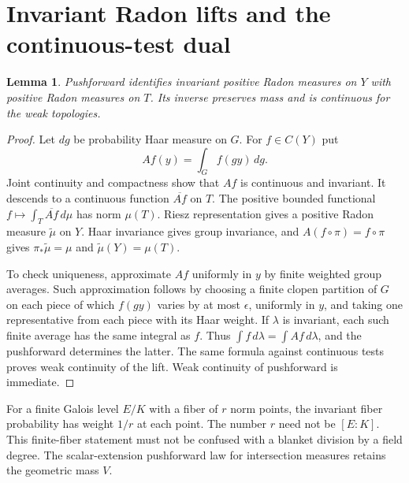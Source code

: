 \documentclass[11pt]{article}
\newtheorem{lemma}[theorem]{Lemma}
\theoremstyle{remark}
\begin{document}
\section{Invariant Radon lifts and the continuous-test dual}

\begin{lemma}\label{lem:radon}
Pushforward identifies invariant positive Radon measures on $Y$ with
positive Radon measures on $T$. Its inverse preserves mass and is
continuous for the weak topologies.
\end{lemma}
\begin{proof}
Let $dg$ be probability Haar measure on $G$. For $f\in C(Y)$ put
\[
 Af(y)=\int_G f(gy)\,dg.
\]
Joint continuity and compactness show that $Af$ is continuous and
invariant. It descends to a continuous function $\overline{Af}$ on
$T$. The positive bounded functional
$f\mapsto\int_T\overline{Af}\,d\mu$ has norm $\mu(T)$.
Riesz representation gives a positive Radon measure
$\widetilde\mu$ on $Y$. Haar invariance gives group invariance, and
$A(f\circ\pi)=f\circ\pi$ gives
$\pi_*\widetilde\mu=\mu$ and $\widetilde\mu(Y)=\mu(T)$.

To check uniqueness, approximate $Af$ uniformly in $y$ by finite
weighted group averages. Such approximation follows by choosing a
finite clopen partition of $G$ on each piece of which $f(gy)$ varies
by at most $\epsilon$, uniformly in $y$, and taking one representative
from each piece with its Haar weight. If $\lambda$ is invariant,
each such finite average has the same integral as $f$. Thus
$\int f\,d\lambda=\int Af\,d\lambda$, and the pushforward determines
the latter. The same formula against continuous tests proves weak
continuity of the lift. Weak continuity of pushforward is immediate.
\end{proof}

For a finite Galois level $E/K$ with a fiber of $r$ norm points, the
invariant fiber probability has weight $1/r$ at each point.
The number $r$ need not be $[E:K]$. This finite-fiber statement must
not be confused with a blanket division by a field degree. The
scalar-extension pushforward law for intersection measures retains
the geometric mass $V$.
\end{document}
